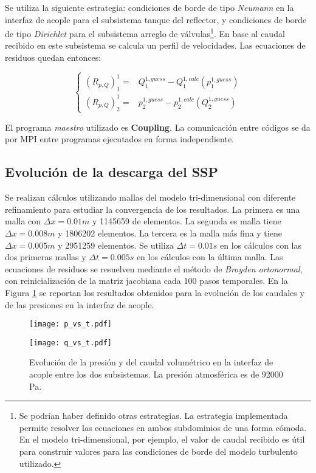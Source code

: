 Se utiliza la siguiente estrategia:
condiciones de borde de tipo \textit{Neumann} en la interfaz de acople para el subsistema tanque del reflector,
y condiciones de borde de tipo \textit{Dirichlet} para el subsistema arreglo de válvulas\footnote{
Se podrían haber definido otras estrategias.
La estrategia implementada permite resolver las ecuaciones en ambos subdominios de una forma cómoda.
En el modelo tri-dimensional, por ejemplo, el valor de caudal recibido es útil para construir valores para las condiciones de borde del modelo turbulento utilizado.
}.
En base al caudal recibido en este subsistema se calcula un perfil de velocidades.
Las ecuaciones de residuos quedan entonces:

\begin{equation}
\left\{ \begin{array}{rl}
(R_{p,Q})_{1}^{1} =& Q_1^{1,guess} - Q_1^{1,calc}(p_1^{1,guess}) \\
(R_{p,Q})_{2}^{1} =& p_2^{1,guess} - p_2^{1,calc}(Q_2^{1,guess})
\end{array}
\right.
\end{equation}

El programa \textit{maestro} utilizado es \textbf{Coupling}.
La comunicación entre códigos se da por MPI entre programas ejecutados en forma independiente.

\subsection*{Evolución de la descarga del SSP}

Se realizan cálculos utilizando mallas del modelo tri-dimensional con diferente refinamiento para estudiar la convergencia de los resultados.
La primera es una malla con $\Delta x=0.01m$ y 1145659 de elementos. 
La segunda es malla tiene $\Delta x=0.008m$ y 1806202 elementos.
La tercera es la malla más fina y tiene $\Delta x=0.005m$ y 2951259 elementos.
Se utiliza $\Delta t=0.01s$ en los cálculos con las dos primeras mallas y $\Delta t=0.005s$ en los cálculos con la última malla.
Las ecuaciones de residuos se resuelven
mediante el método de \textit{Broyden ortonormal},
con reinicialización de la matriz jacobiana cada 100 pasos temporales.
En la Figura \ref{qpvst} se reportan los resultados obtenidos para la evolución de los caudales y de las presiones en la interfaz de acople.

\begin{figure}[ht]
	\begin{minipage}{0.5\linewidth}
		\centering
		\texttt{[image: p\_vs\_t.pdf]}
		\label{asd}	
	\end{minipage}
	\begin{minipage}{0.5\linewidth}
		\centering
		\texttt{[image: q\_vs\_t.pdf]}
		\label{asd}	
	\end{minipage}
	\caption[Evolución de la presión y del caudal volumétrico en la interfaz de acople]
  {Evolución de la presión y del caudal volumétrico en la interfaz de acople entre los dos subsistemas.
  La presión atmosférica es de 92000 Pa.}  
	\label{qpvst}
\end{figure}

